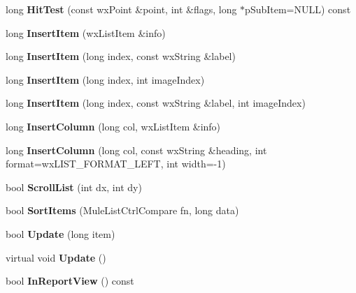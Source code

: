 \begin{DoxyCompactItemize}
\item 
long {\bfseries HitTest} (const wxPoint \&point, int \&flags, long $\ast$pSubItem=NULL) const \label{classMuleExtern_1_1wxGenericListCtrl_aa2a45614c6722e95eb23148a88a71308}

\item 
long {\bfseries InsertItem} (wxListItem \&info)\label{classMuleExtern_1_1wxGenericListCtrl_aa729ef1d966dd1de2355ac2e57126fea}

\item 
long {\bfseries InsertItem} (long index, const wxString \&label)\label{classMuleExtern_1_1wxGenericListCtrl_a75b0973488d6c15cc571f2a824ac379c}

\item 
long {\bfseries InsertItem} (long index, int imageIndex)\label{classMuleExtern_1_1wxGenericListCtrl_a4254ead7deb53da5e91c95e1eda0cd80}

\item 
long {\bfseries InsertItem} (long index, const wxString \&label, int imageIndex)\label{classMuleExtern_1_1wxGenericListCtrl_abc318947422102f34d9fca054af9f5fd}

\item 
long {\bfseries InsertColumn} (long col, wxListItem \&info)\label{classMuleExtern_1_1wxGenericListCtrl_a8e62510ed62206e8ba44a99e844db9ab}

\item 
long {\bfseries InsertColumn} (long col, const wxString \&heading, int format=wxLIST\_\-FORMAT\_\-LEFT, int width=-\/1)\label{classMuleExtern_1_1wxGenericListCtrl_ad614355cf2a6bfd90b7e41d7d9730e7c}

\item 
bool {\bfseries ScrollList} (int dx, int dy)\label{classMuleExtern_1_1wxGenericListCtrl_ad8cb2b7c7beac566532f86c8d0847039}

\item 
bool {\bfseries SortItems} (MuleListCtrlCompare fn, long data)\label{classMuleExtern_1_1wxGenericListCtrl_ac6b92b3c96c342d5e480c2b39135d075}

\item 
bool {\bfseries Update} (long item)\label{classMuleExtern_1_1wxGenericListCtrl_ac08014c9046e51d5ba28ffd0dcdc2d92}

\item 
virtual void {\bfseries Update} ()\label{classMuleExtern_1_1wxGenericListCtrl_acd3f9b5ad6958389da4250f5e01395c8}

\item 
bool {\bfseries InReportView} () const \label{classMuleExtern_1_1wxGenericListCtrl_a889fc3f46b85ef2726a6a33dbeae908d}


\end{DoxyCompactItemize}
